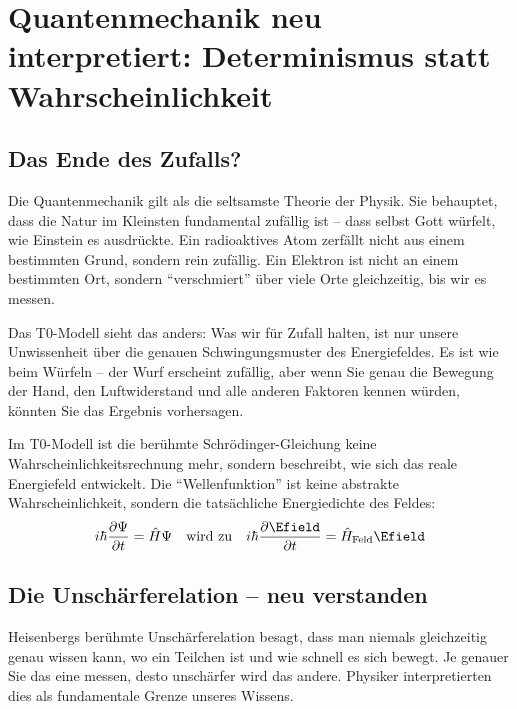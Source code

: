 	\section{Quantenmechanik neu interpretiert: Determinismus statt Wahrscheinlichkeit}
	
	\subsection{Das Ende des Zufalls?}
	
	Die Quantenmechanik gilt als die seltsamste Theorie der Physik. Sie behauptet, dass die Natur im Kleinsten fundamental zufällig ist -- dass selbst Gott würfelt, wie Einstein es ausdrückte. Ein radioaktives Atom zerfällt nicht aus einem bestimmten Grund, sondern rein zufällig. Ein Elektron ist nicht an einem bestimmten Ort, sondern ``verschmiert'' über viele Orte gleichzeitig, bis wir es messen.
	
	Das T0-Modell sieht das anders: Was wir für Zufall halten, ist nur unsere Unwissenheit über die genauen Schwingungsmuster des Energiefeldes. Es ist wie beim Würfeln -- der Wurf erscheint zufällig, aber wenn Sie genau die Bewegung der Hand, den Luftwiderstand und alle anderen Faktoren kennen würden, könnten Sie das Ergebnis vorhersagen.
	
	\begin{quantum}
		Im T0-Modell ist die berühmte Schrödinger-Gleichung keine Wahrscheinlichkeitsrechnung mehr, sondern beschreibt, wie sich das reale Energiefeld entwickelt. Die ``Wellenfunktion'' ist keine abstrakte Wahrscheinlichkeit, sondern die tatsächliche Energiedichte des Feldes:
		\begin{equation}
			i\hbar \frac{\partial \Psi}{\partial t} = \hat{H}\Psi \quad \text{wird zu} \quad i\hbar \frac{\partial \Efield}{\partial t} = \hat{H}_{\text{Feld}}\Efield
		\end{equation}
	\end{quantum}
	
	\subsection{Die Unschärferelation -- neu verstanden}
	
	Heisenbergs berühmte Unschärferelation besagt, dass man niemals gleichzeitig genau wissen kann, wo ein Teilchen ist und wie schnell es sich bewegt. Je genauer Sie das eine messen, desto unschärfer wird das andere. Physiker interpretierten dies als fundamentale Grenze unseres Wissens.
	
